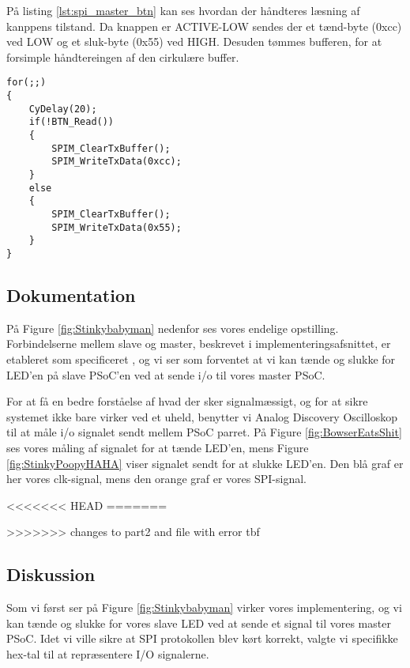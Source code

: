 \documentclass[../main.tex]{subfiles}
\begin{document}
På listing \ref{lst:spi_master_btn} kan ses hvordan der håndteres læsning af kanppens tilstand. Da knappen er ACTIVE-LOW sendes der et tænd-byte (0xcc) ved LOW og et sluk-byte (0x55) ved HIGH. Desuden tømmes bufferen, for at forsimple håndtereingen af den cirkulære buffer.

\begin{lstlisting}[caption={Håndtering af knappens input på SPI Master - med knap}, label=lst:spi_master_btn]
for(;;)
{
    CyDelay(20);
    if(!BTN_Read())
    {
        SPIM_ClearTxBuffer();
        SPIM_WriteTxData(0xcc); 
    }
    else
    {
        SPIM_ClearTxBuffer();
        SPIM_WriteTxData(0x55);
    }
}
\end{lstlisting}

\subsection{Dokumentation}
På Figure \ref{fig:Stinkybabyman} nedenfor ses vores endelige opstilling. Forbindelserne mellem slave og master, beskrevet i implementeringsafsnittet, er etableret som specificeret
, og vi ser som forventet at vi kan tænde og slukke for LED'en på slave PSoC'en ved at sende i/o til vores master PSoC.


For at få en bedre forståelse af hvad der sker signalmæssigt, og for at sikre systemet ikke bare virker ved et uheld, benytter vi Analog Discovery Oscilloskop til at måle  i/o signalet sendt mellem PSoC parret.
 På Figure \ref{fig:BowserEatsShit} ses vores måling af signalet for at tænde LED'en, mens Figure \ref{fig:StinkyPoopyHAHA} viser signalet sendt for at slukke LED'en. Den blå graf er her 
 vores clk-signal, mens den orange graf er vores SPI-signal. 

<<<<<<< HEAD
=======
 
>>>>>>> changes to part2 and file with error tbf
 
\subsection{Diskussion}
Som vi først ser på Figure \ref{fig:Stinkybabyman} virker vores implementering, og vi kan tænde og slukke for vores slave LED ved at sende et signal til vores master PSoC.
Idet vi ville sikre at SPI protokollen blev kørt korrekt, valgte vi specifikke hex-tal til at repræsentere I/O signalerne. 
\end{document}
